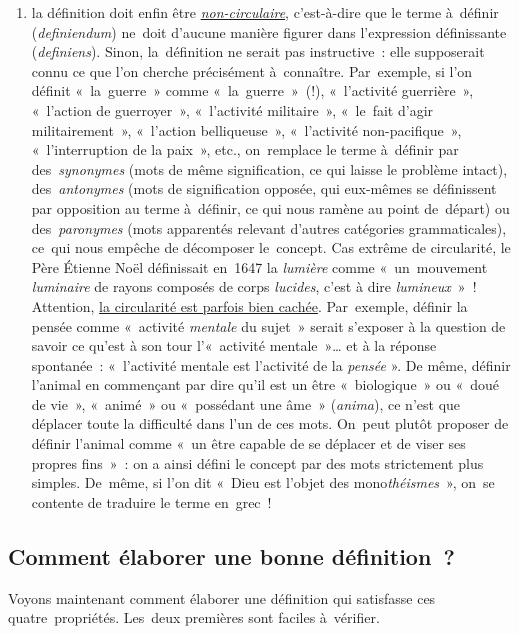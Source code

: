\documentclass[a4paper,12pt]{report}
\begin{document}
\begin{enumerate}
\item la définition doit enfin être \uline{\emph{non-circulaire}}, c'est-à-dire que le
terme à définir (\emph{definiendum}​) ne doit d'aucune manière figurer dans
l'expres\-sion définissante (\emph{definiens}​). Sinon, la définition ne
serait pas instructive : elle supposerait connu ce que l'on cherche
précisément à connaître. Par exemple, si l'on définit « la guerre »
comme « la guerre » (!), « l'activité guerrière », « l'action de
guerroyer », « l'activité militaire », « le fait d'agir
militairement », « l'action belliqueuse », « l'activité
non-pacifique », « l'interruption de la paix », etc., on remplace le
terme à définir par des \emph{synonymes} (mots de même signification, ce
qui laisse le problème intact), des \emph{antonymes} (mots de
signification opposée, qui eux-mêmes se définissent par opposition au
terme à définir, ce qui nous ramène au point de départ) ou
des \emph{paronymes} (mots apparentés relevant d'autres catégories
grammaticales), ce qui nous empêche de décomposer le concept. Cas
extrême de circularité, le Père Étienne Noël définissait en 1647 la
\emph{lumière} comme « un mouvement \emph{luminaire} de rayons composés de
corps \emph{lucides}, c'est à dire \emph{lumineux} » ! Atten\-tion, \uline{la
circularité est parfois bien cachée}. Par exemple, définir la pensée
comme « activité \emph{mentale} du sujet » serait s'exposer à la question
de savoir ce qu'est à son tour l'« activité mentale »\ldots{} et à la
réponse spontanée : « l'activité mentale est l'activité de la
\emph{pensée} ». De même, définir l'animal en commençant par dire qu'il
est un être « biologique » ou « doué de vie », « animé » ou
« possédant une âme » (\emph{anima}​), ce n'est que déplacer toute la
difficulté dans l'un de ces mots. On peut plutôt proposer de définir
l'animal comme « un être capable de se déplacer et de viser ses
propres fins » : on a ainsi défini le concept par des mots
strictement plus simples. De même, si l'on dit « Dieu est l'objet des
mono\emph{théismes} », on se contente de traduire le terme en grec !
\end{enumerate}


\subsection{Comment élaborer une bonne définition ?}
\label{sec:org2c94e85}

Voyons maintenant comment élaborer une définition qui satisfasse ces
quatre propriétés. Les deux premières sont faciles à vérifier.
\end{document}
